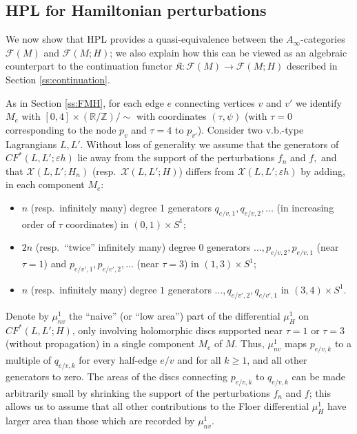 \documentclass[11pt,leqno]{amsart}
\numberwithin{equation}{section}
\def\R{\mathbb{R}}
\def\Z{\mathbb{Z}}
\newcommand{\cF}{{\mathcal F}}
\newcommand{\cX}{{\mathcal X}}
\begin{document}
\subsection{HPL for Hamiltonian perturbations}
\label{ss:HPLFloer}

We now show that HPL provides a quasi-equivalence between the
$A_{\infty}$-categories $\cF(M)$ and $\cF(M;H)$; we
also explain how this can be viewed as an algebraic counterpart to
the continuation functor $\mathfrak{K}:\cF(M)\to \cF(M;H)$ described in
Section \ref{ss:continuation}.

As in Section \ref{ss:FMH}, for each edge $e$ connecting vertices $v$ and
$v'$ we identify $M_e$ with $[0,4]\times (\R/\Z)/\!\sim$ with coordinates
$(\tau,\psi)$ (with $\tau=0$ corresponding to the node $p_v$ and $\tau=4$ to
$p_{v'}$). Consider two v.b.-type Lagrangians $L,L'$. Without loss
of generality we assume that the generators of $CF^*(L,L';\varepsilon h)$ lie away from
the support of the perturbations $f_n$ and $f,$
and that $\cX(L,L';H_n)$ (resp.\ $\cX(L,L';H)$) differs from
$\cX(L,L';\varepsilon h)$ by adding, in each component $M_e$:
\begin{itemize}
\item $n$ (resp.\ infinitely many) degree 1 generators
$q_{e/v,1},q_{e/v,2},\dots$ (in increasing order of $\tau$ coordinates) in $(0,1)\times S^1;$

\item $2n$ (resp.\ ``twice'' infinitely many) degree 0 generators
$\dots,p_{e/v,2},p_{e/v,1}$ (near $\tau=1$) and
$p_{e/v',1},p_{e/v',2},\dots$ (near $\tau=3$) in $(1,3)\times S^1;$

\item $n$ (resp.\ infinitely many) degree $1$ generators
$\dots,q_{e/v',2},q_{e/v',1}$ in $(3,4)\times S^1.$ 
\end{itemize}

Denote by $\mu^1_{nv}$ the ``naive'' (or ``low area'') part of the differential 
$\mu^1_H$ on $CF^*(L,L';H)$, only involving holomorphic
discs supported near $\tau=1$ or $\tau=3$ (without propagation) in a single
component $M_e$ of $M$. Thus,
$\mu^1_{nv}$ maps
$p_{e/v,k}$ to a multiple of $q_{e/v,k}$ for every half-edge $e/v$ and for all $k\geq
1$, and all other generators to zero. The areas of the discs
connecting $p_{e/v,k}$ to $q_{e/v,k}$ can be made arbitrarily small by
shrinking the support of the perturbations $f_n$ and $f$; this allows us to
assume that all other contributions to the Floer differential $\mu^1_H$ have larger
area than those which are recorded by $\mu^1_{nv}$.
\end{document}
